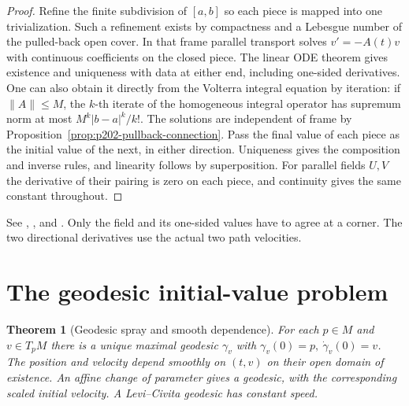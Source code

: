 \documentclass[11pt,oneside,openany]{book}
\theoremstyle{plain}
\newtheorem{theorem}{Theorem}[chapter]
\theoremstyle{definition}
\theoremstyle{remark}
\begin{document}
\begin{proof}
Refine the finite subdivision of \([a,b]\) so each piece is mapped
into one trivialization. Such a refinement exists by compactness
and a Lebesgue number of the pulled-back open cover. In that frame
parallel transport solves \(v'=-A(t)v\) with continuous coefficients
on the closed piece. The linear ODE theorem gives existence and
uniqueness with data at either end, including one-sided derivatives.
One can also obtain it directly from the Volterra integral equation
by iteration: if \(\lVert A\rVert\leq M\), the \(k\)-th iterate of
the homogeneous integral operator has supremum norm at most
\(M^k\lvert b-a\rvert^k/k!\).
The solutions are independent of frame by
Proposition~\ref{prop:p202-pullback-connection}.
Pass the final value of each piece as the initial value of the next,
in either direction. Uniqueness gives the composition and inverse
rules, and linearity follows by superposition.
For parallel fields \(U,V\) the derivative of their pairing is zero
on each piece, and continuity gives the same constant throughout.
\end{proof}

See \cite[Theorems 4.31--4.35 and the author's corrections]{LeeRM},
\cite[Chapter 2, Section 2]{dC}, and \cite[Chapter 7]{D13}.
Only the field and its one-sided values have to agree at a corner.
The two directional derivatives use the actual two path velocities.

\section{The geodesic initial-value problem}\label{p202:G07}

\begin{theorem}[Geodesic spray and smooth dependence]
\label{thm:p202-geodesic-ivp}
For each \(p\in M\) and \(v\in T_pM\) there is a unique maximal
geodesic \(\gamma_v\) with \(\gamma_v(0)=p,\ \dot\gamma_v(0)=v\).
The position and velocity depend smoothly on \((t,v)\) on their
open domain of existence. An affine change of parameter gives a
geodesic, with the corresponding scaled initial velocity.
A Levi--Civita geodesic has constant speed.
\end{theorem}
\end{document}
